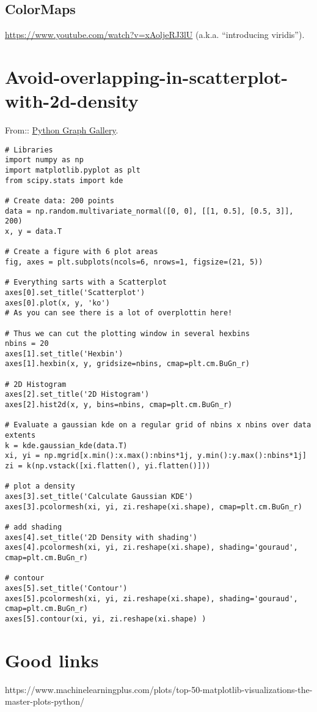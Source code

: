 \documentclass[11pt,a4paper]{article}
\begin{document}
\subsection{ColorMaps}
\href{A Better Default Colormap for Matplotlib (SciPy 2015; Nathaniel Smith and Stéfan van der Walt)}{https://www.youtube.com/watch?v=xAoljeRJ3lU} (a.k.a. ``introducing viridis''). 




\section{Avoid-overlapping-in-scatterplot-with-2d-density}
From::
\href{https://python-graph-gallery.com/86-avoid-overlapping-in-scatterplot-with-2d-density/}{Python
Graph Gallery}.

\begin{lstlisting}
# Libraries
import numpy as np
import matplotlib.pyplot as plt
from scipy.stats import kde
 
# Create data: 200 points
data = np.random.multivariate_normal([0, 0], [[1, 0.5], [0.5, 3]], 200)
x, y = data.T
 
# Create a figure with 6 plot areas
fig, axes = plt.subplots(ncols=6, nrows=1, figsize=(21, 5))
 
# Everything sarts with a Scatterplot
axes[0].set_title('Scatterplot')
axes[0].plot(x, y, 'ko')
# As you can see there is a lot of overplottin here!
 
# Thus we can cut the plotting window in several hexbins
nbins = 20
axes[1].set_title('Hexbin')
axes[1].hexbin(x, y, gridsize=nbins, cmap=plt.cm.BuGn_r)
 
# 2D Histogram
axes[2].set_title('2D Histogram')
axes[2].hist2d(x, y, bins=nbins, cmap=plt.cm.BuGn_r)
 
# Evaluate a gaussian kde on a regular grid of nbins x nbins over data extents
k = kde.gaussian_kde(data.T)
xi, yi = np.mgrid[x.min():x.max():nbins*1j, y.min():y.max():nbins*1j]
zi = k(np.vstack([xi.flatten(), yi.flatten()]))
 
# plot a density
axes[3].set_title('Calculate Gaussian KDE')
axes[3].pcolormesh(xi, yi, zi.reshape(xi.shape), cmap=plt.cm.BuGn_r)
 
# add shading
axes[4].set_title('2D Density with shading')
axes[4].pcolormesh(xi, yi, zi.reshape(xi.shape), shading='gouraud', cmap=plt.cm.BuGn_r)
 
# contour
axes[5].set_title('Contour')
axes[5].pcolormesh(xi, yi, zi.reshape(xi.shape), shading='gouraud', cmap=plt.cm.BuGn_r)
axes[5].contour(xi, yi, zi.reshape(xi.shape) )

\end{lstlisting}



\newpage
\section{Good links}
https://www.machinelearningplus.com/plots/top-50-matplotlib-visualizations-the-master-plots-python/
\end{document}
